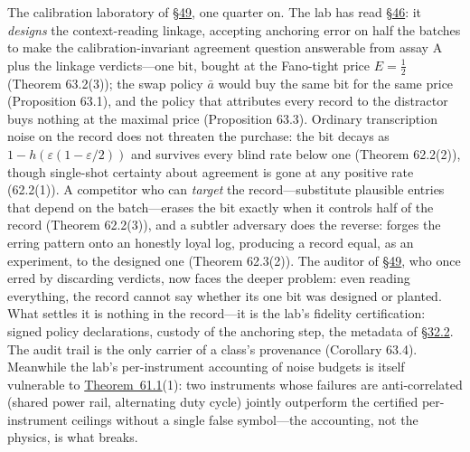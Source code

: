 The calibration laboratory of \hyperlink{sec:49}{§49}, one quarter on. The lab has read \hyperlink{sec:46}{§46}: it \emph{designs} the context-reading linkage, accepting anchoring error on half the batches to make the calibration-invariant agreement question answerable from assay A plus the linkage verdicts---\hspace{0pt}one bit, bought at the Fano-tight price \(E = \tfrac12\) (Theorem 63.2(3)); the swap policy \(\bar a\) would buy the same bit for the same price (Proposition 63.1), and the policy that attributes every record to the distractor buys nothing at the maximal price (Proposition 63.3). Ordinary transcription noise on the record does not threaten the purchase: the bit decays as \(1 - h(\varepsilon(1 - \varepsilon/2))\) and survives every blind rate below one (Theorem 62.2(2)), though single-shot certainty about agreement is gone at any positive rate (62.2(1)). A competitor who can \emph{target} the record---\hspace{0pt}substitute plausible entries that depend on the batch---\hspace{0pt}erases the bit exactly when it controls half of the record (Theorem 62.2(3)), and a subtler adversary does the reverse: forges the erring pattern onto an honestly loyal log, producing a record equal, as an experiment, to the designed one (Theorem 62.3(2)). The auditor of \hyperlink{sec:49}{§49}, who once erred by discarding verdicts, now faces the deeper problem: even reading everything, the record cannot say whether its one bit was designed or planted. What settles it is nothing in the record---\hspace{0pt}it is the lab's fidelity certification: signed policy declarations, custody of the anchoring step, the metadata of \hyperlink{sec:32.2}{§32.2}. The audit trail is the only carrier of a class's provenance (Corollary 63.4). Meanwhile the lab's per-instrument accounting of noise budgets is itself vulnerable to \hyperlink{stmt:61.1}{Theorem~61.1}(1): two instruments whose failures are anti-correlated (shared power rail, alternating duty cycle) jointly outperform the certified per-instrument ceilings without a single false symbol---\hspace{0pt}the accounting, not the physics, is what breaks.


